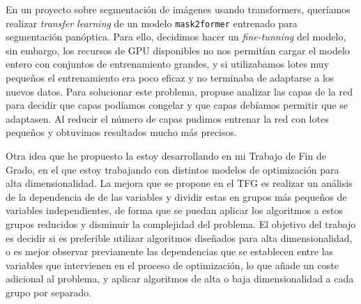 \documentclass[12pt,a4paper]{article}
\begin{document}
	En un proyecto sobre segmentación de imágenes usando transformers, queríamos realizar \textit{transfer learning} de un modelo \texttt{mask2former} entrenado para segmentación panóptica. Para ello, decidimos hacer un \textit{fine-tunning} del modelo, sin embargo, los recursos de GPU disponibles no nos permitían cargar el modelo entero con conjuntos de entrenamiento grandes, y si utilizabamos lotes muy pequeños el entrenamiento era poco eficaz y no terminaba de adaptarse a los nuevos datos. Para solucionar este problema, propuse analizar las capas de la red para decidir que capas podíamos congelar y que capas debíamos permitir que se adaptasen. Al reducir el número de capas pudimos entrenar la red con lotes pequeños y obtuvimos resultados mucho más precisos.
	
	Otra idea que he propuesto la estoy desarrollando en mi Trabajo de Fin de Grado, en el que estoy trabajando con distintos modelos de optimización para alta dimensionalidad. La mejora que se propone en el TFG es realizar un análisis de la dependencia de de las variables y dividir estas en grupos más pequeños de variables independientes, de forma que se puedan aplicar los algoritmos a estos grupos reducidos y disminuir la complejidad del problema. El objetivo del trabajo es decidir si es preferible utilizar algoritmos diseñados para alta dimensionalidad, o es mejor observar previamente las dependencias que se establecen entre las variables que intervienen en el proceso de optimización, lo que añade un coste adicional al problema, y aplicar algoritmos de alta o baja dimensionalidad a cada grupo por separado.
\end{document}
